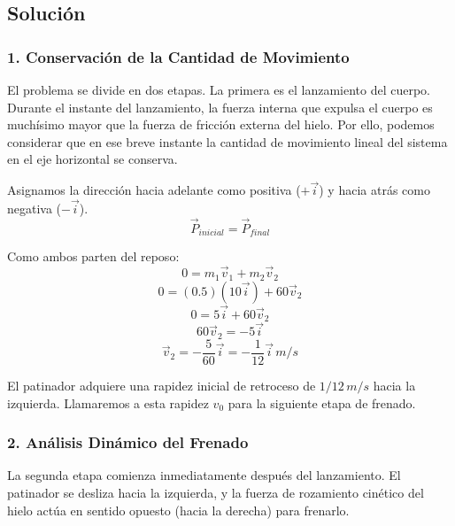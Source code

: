\documentclass[12pt, a4paper]{article}
\begin{document}
\subsection*{Solución}

\subsubsection*{1. Conservación de la Cantidad de Movimiento}
El problema se divide en dos etapas. La primera es el lanzamiento del cuerpo. Durante el instante del lanzamiento, la fuerza interna que expulsa el cuerpo es muchísimo mayor que la fuerza de fricción externa del hielo. Por ello, podemos considerar que en ese breve instante la cantidad de movimiento lineal del sistema en el eje horizontal se conserva.

Asignamos la dirección hacia adelante como positiva ($+\vec{i}$) y hacia atrás como negativa ($-\vec{i}$).
\[ \vec{P}_{inicial} = \vec{P}_{final} \]

Como ambos parten del reposo:
\[ 0 = m_1 \vec{v}_1 + m_2 \vec{v}_2 \]
\[ 0 = (0.5)(10 \vec{i}) + 60 \vec{v}_2 \]
\[ 0 = 5 \vec{i} + 60 \vec{v}_2 \]
\[ 60 \vec{v}_2 = -5 \vec{i} \]
\[ \vec{v}_2 = -\frac{5}{60} \vec{i} = -\frac{1}{12} \vec{i} \, \si{m/s} \]

El patinador adquiere una rapidez inicial de retroceso de $1/12 \, \si{m/s}$ hacia la izquierda. Llamaremos a esta rapidez $v_0$ para la siguiente etapa de frenado.

\subsubsection*{2. Análisis Dinámico del Frenado}
La segunda etapa comienza inmediatamente después del lanzamiento. El patinador se desliza hacia la izquierda, y la fuerza de rozamiento cinético del hielo actúa en sentido opuesto (hacia la derecha) para frenarlo.
\end{document}
